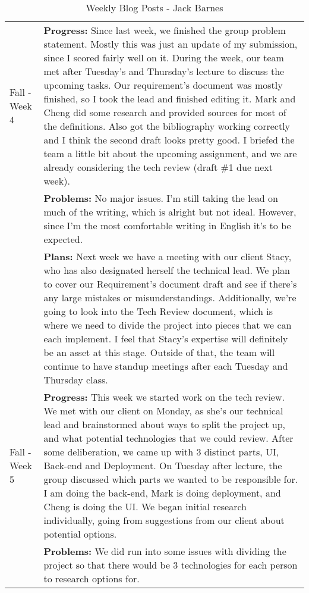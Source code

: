 \begin{longtable}[ht]{| p{1.5cm} | p{13.5cm} |}
    \caption{Weekly Blog Posts - Jack Barnes}
     \\\hline
     Fall - Week 4 &
     \textbf{Progress:} Since last week, we finished the group problem statement.
     Mostly this was just an update of my submission, since I scored fairly well on it.
     During the week, our team met after Tuesday's and Thursday's lecture to discuss the upcoming tasks.
     Our requirement's document was mostly finished, so I took the lead and finished editing it.
     Mark and Cheng did some research and provided sources for most of the definitions.
     Also got the bibliography working correctly and I think the second draft looks pretty good.
     I briefed the team a little bit about the upcoming assignment, and we are already considering the tech review (draft \#1 due next week).
     \\ & \textbf{Problems:} No major issues. I'm still taking the lead on much of the writing, which is alright but not ideal.
     However, since I'm the most comfortable writing in English it's to be expected.
     \\ & \textbf{Plans:} Next week we have a meeting with our client Stacy, who has also designated herself the technical lead.
     We plan to cover our Requirement's document draft and see if there's any large mistakes or misunderstandings.
     Additionally, we're going to look into the Tech Review document, which is where we need to divide the project into pieces that we can each implement.
     I feel that Stacy's expertise will definitely be an asset at this stage.
     Outside of that, the team will continue to have standup meetings after each Tuesday and Thursday class. \\
     \hline
     Fall - Week 5 &
     \textbf{Progress:} This week we started work on the tech review.
     We met with our client on Monday, as she's our technical lead and brainstormed about ways to split the project up, and what potential technologies that we could review.
     After some deliberation, we came up with 3 distinct parts, UI, Back-end and Deployment.
     On Tuesday after lecture, the group discussed which parts we wanted to be responsible for.
     I am doing the back-end, Mark is doing deployment, and Cheng is doing the UI. We began initial research individually, going from suggestions from our client about potential options.
     \\ & \textbf{Problems:} We did run into some issues with dividing the project so that there would be 3 technologies for each person to research options for.

\end{longtable}
